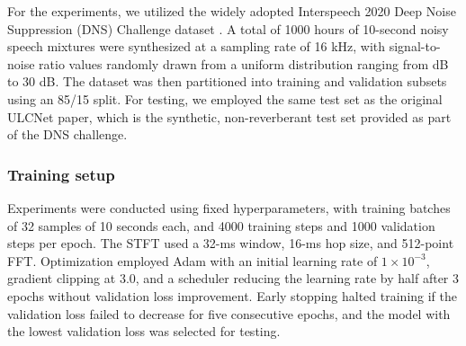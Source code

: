 \documentclass[9pt]{article}
\begin{document}
For the experiments, we utilized the widely adopted Interspeech 2020 Deep Noise Suppression (DNS) Challenge dataset \cite{C12}. A total of 1000 hours of 10-second noisy speech mixtures were synthesized at a sampling rate of 16 kHz, with signal-to-noise ratio values randomly drawn from a uniform distribution ranging from  dB to 30 dB. The dataset was then partitioned into training and validation subsets using an 85/15 split. For testing, we employed the same test set as the original ULCNet paper, which is the synthetic, non-reverberant test set provided as part of the DNS challenge.

\subsubsection{Training setup}
\label{sssec:training_setup}

Experiments were conducted using fixed hyperparameters, with training batches of 32 samples of 10 seconds each, and 4000 training steps and 1000 validation steps per epoch. The STFT used a 32-ms window, 16-ms hop size, and 512-point FFT. Optimization employed Adam with an initial learning rate of  $1 \times 10^{-3}$, gradient clipping at 3.0, and a scheduler reducing the learning rate by half after 3 epochs without validation loss improvement. Early stopping halted training if the validation loss failed to decrease for five consecutive epochs, and the model with the lowest validation loss was selected for testing.


\begin{table}[ht]
\captionsetup{skip=10pt}
\centering
\caption{Number of parameters, MACs and mean RTF measurement on the Raspberry Pi 3 B+ (Pi3) and Arm Cortex-A53 (ARM).}
\label{tab:model_performance_embedded}
\end{table}
\vspace{-8pt}
\end{document}
